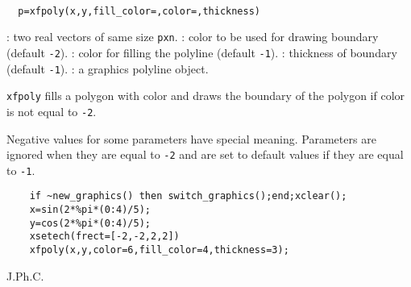 \begin{mandesc}
  \\
\end{mandesc}
\begin{calling_sequence}
\begin{verbatim}
  p=xfpoly(x,y,fill_color=,color=,thickness)
\end{verbatim}
\end{calling_sequence}
\begin{parameters}
  \begin{varlist}
    : two real vectors of same size \verb!pxn!.
    : color to be used for drawing boundary (default \verb!-2!).
    : color for filling the polyline (default \verb!-1!).
    : thickness of boundary (default \verb!-1!).
    : a graphics polyline object.
  \end{varlist}
\end{parameters}

\begin{mandescription}
  \verb!xfpoly! fills a polygon with color and draws the boundary of
  the polygon if color is not equal to \verb!-2!.

  Negative values for some parameters have special meaning.
  Parameters are ignored when they are equal to \verb!-2!
  and are set to default values if they are equal to \verb!-1!.
\end{mandescription}

\begin{examples}
  \begin{Verbatim}
    if ~new_graphics() then switch_graphics();end;xclear();
    x=sin(2*%pi*(0:4)/5);
    y=cos(2*%pi*(0:4)/5);
    xsetech(frect=[-2,-2,2,2])
    xfpoly(x,y,color=6,fill_color=4,thickness=3);
  \end{Verbatim}
\end{examples}

\begin{manseealso}
    
\end{manseealso}


\begin{authors}
  J.Ph.C.

\end{authors}
